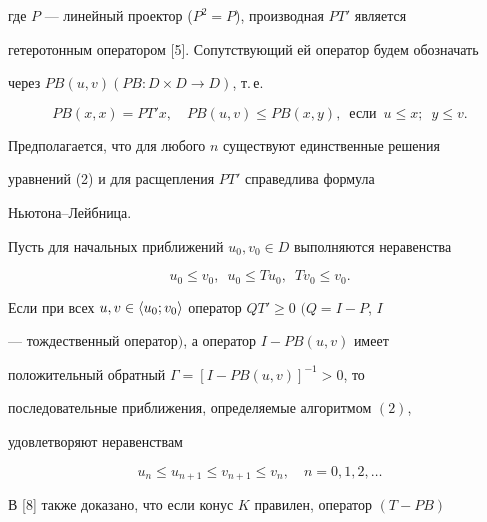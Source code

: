 где $P$ --- линейный проектор ($P^2=P$), производная $P T'$ является 


гетеротонным оператором [5]. Сопутствующий ей оператор будем обозначать 


через $P B(u,v)(P B:D\times D\to D)$, т.\,е. 


\begin{equation} 


P B(x,x)=P T' x,\quad P B(u,v)\le P B(x,y),\ \; 


\text{если} \ \; u\le x;\ \; y\le v. 


\end{equation} 


Предполагается, что для любого $n$ существуют единственные решения 


уравнений (2) и для расщепления $P T'$ справедлива формула 


Ньютона--Лейбница. 


 


\begin{lem} 


Пусть для начальных приближений $u_0,v_0\in D$ выполняются неравенства 


\begin{equation} 


u_0\le v_0,\ \; u_0\le T u_0,\ \; T v_0\le v_0. 


\end{equation} 


Если при всех $u,v\in\langle u_0;v_0\rangle$ оператор $Q T'\ge0$ $(Q=I-P$, $I$ 


--- тождественный оператор$)$, а оператор $I -P B(u,v)$ имеет 


положительный обратный $\Gamma=[I -P B(u,v)]^{-1}>0$, то 


последовательные приближения, определяемые алгоритмом $(2)$, 


удовлетворяют неравенствам 


\begin{equation} 


u_n\le u_{n+1}\le v_{n+1}\le v_n,\quad n=0,1,2,\dotsc 


\end{equation} 


\end{lem} 


 


В [8] также доказано, что если конус $K$ правилен, оператор $(T-P B)$ 


